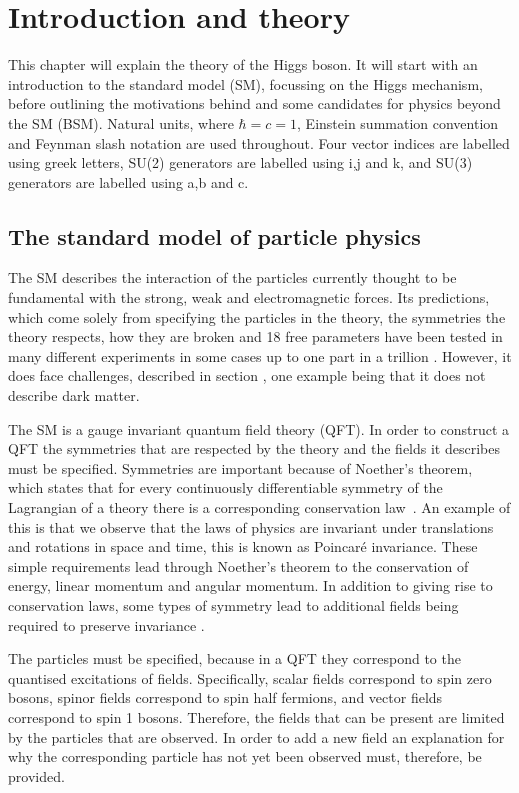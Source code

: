 \chapter{Introduction and theory}
\label{chap:theory}
This chapter will explain the theory of the Higgs boson. It will start with an introduction to the standard model (SM), focussing on the Higgs mechanism, before outlining the motivations behind and some candidates for physics beyond the SM (BSM). Natural units, where $\hbar=c=1$, Einstein summation convention and Feynman slash notation are used throughout. Four vector indices are labelled using greek letters, SU(2) generators are labelled using i,j and k, and SU(3) generators are labelled using a,b and c.

\section{The standard model of particle physics}
\label{sec:SM}
The SM describes the interaction of the particles currently thought to be fundamental with the strong, weak and electromagnetic forces. Its predictions, which come solely from specifying the particles in the theory, the symmetries the theory respects, how they are broken and 18 free parameters have been tested in many different experiments in some cases up to one part in a trillion \cite{PhysRevLett.100.120801}. However, it does face challenges, described in section , one example being that it does not describe dark matter. 

The SM is a gauge invariant quantum field theory (QFT). In order to construct a QFT the symmetries that are respected by the theory and the fields it describes must be specified. Symmetries are important because of Noether's theorem, which states that for every continuously differentiable symmetry of the Lagrangian of a theory there is a corresponding conservation law~\cite{Noether:1918zz,doi:10.1080/00411457108231446}. An example of this is that we observe that the laws of physics are invariant under translations and rotations in space and time, this is known as Poincar\'e invariance. These simple requirements lead through Noether's theorem to the conservation of energy, linear momentum and angular momentum. In addition to giving rise to conservation laws, some types of symmetry lead to additional fields being required to preserve invariance \cite{PhysRev.96.191}.

The particles must be specified, because in a QFT they correspond to the quantised excitations of fields. Specifically, scalar fields correspond to spin zero bosons, spinor fields correspond to spin half fermions, and vector fields correspond to spin 1 bosons. Therefore, the fields that can be present are limited by the particles that are observed. In order to add a new field an explanation for why the corresponding particle has not yet been observed must, therefore, be provided.

